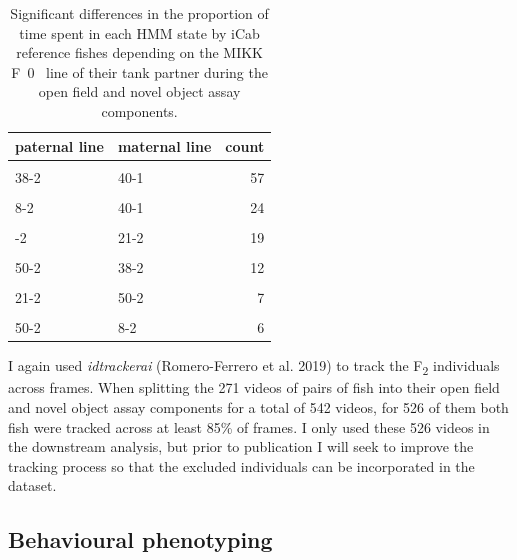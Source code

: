 \documentclass[
]{book}
\begin{document}
\begin{table}

\caption{\label{tab:F2-cross-counts}Significant differences in the proportion of time spent in each HMM state by iCab reference fishes depending on the MIKK F~0~ line of their tank partner during the open field and novel object assay components.}
\centering
\begin{tabular}[t]{llr}
\toprule
paternal line & maternal line & count\\
\midrule
\cellcolor{gray!6}{21-2} & \cellcolor{gray!6}{40-1} & \cellcolor{gray!6}{60}\\
38-2 & 40-1 & 57\\
\cellcolor{gray!6}{38-2} & \cellcolor{gray!6}{18-2} & \cellcolor{gray!6}{35}\\
8-2 & 40-1 & 24\\
\cellcolor{gray!6}{50-2} & \cellcolor{gray!6}{18-2} & \cellcolor{gray!6}{23}\\
\addlinespace
38-2 & 21-2 & 19\\
\cellcolor{gray!6}{8-2} & \cellcolor{gray!6}{38-2} & \cellcolor{gray!6}{15}\\
50-2 & 38-2 & 12\\
\cellcolor{gray!6}{18-2} & \cellcolor{gray!6}{21-2} & \cellcolor{gray!6}{7}\\
21-2 & 50-2 & 7\\
\addlinespace
\cellcolor{gray!6}{40-1} & \cellcolor{gray!6}{50-2} & \cellcolor{gray!6}{6}\\
50-2 & 8-2 & 6\\
\bottomrule
\end{tabular}
\end{table}

I again used \emph{idtrackerai} (Romero-Ferrero et al. 2019) to track the F\textsubscript{2} individuals across frames. When splitting the 271 videos of pairs of fish into their open field and novel object assay components for a total of 542 videos, for 526 of them both fish were tracked across at least 85\% of frames. I only used these 526 videos in the downstream analysis, but prior to publication I will seek to improve the tracking process so that the excluded individuals can be incorporated in the dataset.

\hypertarget{behavioural-phenotyping}{%
\subsection{Behavioural phenotyping}\label{behavioural-phenotyping}}
\end{document}
